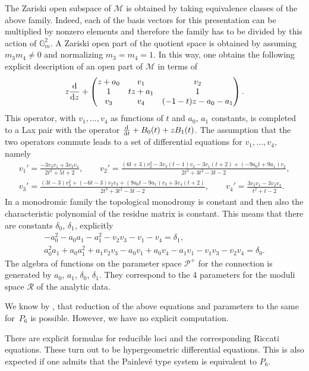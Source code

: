 \documentclass[10pt,a4paper]{amsart}
\numberwithin{equation}{section}
\begin{document}
The Zariski open subspace of $\mathcal{M}$ is obtained by taking equivalence classes of the above family.
Indeed, each of the basis vectors for this presentation can be multiplied by nonzero elements and therefore the family has to
 be divided by this action of $\mathbb{G}_m^2$. A Zariski open part of the quotient space is obtained by assuming
 $m_3m_4\neq 0$ and normalizing $m_3=m_4=1$. In this way, one obtains the following explicit description of an open part of
 $\mathcal{M}$ in terms of
\[ z\frac{{\rm d}}{{\rm d}z}+\begin{pmatrix} z+a_0&v_1 &v_2 \\ 1 & tz+a_1 &1 \\ v_3& v_4 & (-1-t)z-a_0-a_1\end{pmatrix}.\]
This operator, with $v_1,\dots ,v_4$ as functions of $t$ and $a_0$, $a_1$ constants,
 is completed to a Lax pair with the operator $\frac{{\rm d}}{{\rm d}t}+B_0(t)+zB_1(t)$. The assumption that the two operators
 commute leads to a set of differential equations for $v_1,\dots ,v_4$, namely
 \begin{gather*}
 v_1' = \frac{-3v_3v_1+3v_2v_4}{2t^2+5t+2}, \qquad
 v_2' = \frac{(6t+3)v_2^2-3v_3(t-1)v_2-3v_1(t+2)+(-9a_0t+9a_1)v_2}{2t^3+3t^2-3t-2}, \\
 v_3' = \frac{(3t-3)v_3^2+(-6t-3)v_2v_3+(9a_0t-9a_1)v_3+3v_4(t+2)}{2t^3+3t^2-3t-2},\qquad
 v_4' = \frac{3v_3 v_1-3v_2v_4}{t^2+t-2}. \end{gather*}
 In a monodromic family the topological monodromy is constant and then also the characteristic polynomial of the residue matrix
 is constant. This means that there are constants $\delta_0$, $\delta_1$, explicitly
 \begin{gather*} -a_0^2-a_0a_1-a_1^2-v_2v_3-v_1-v_4=\delta_1,\\
 a_0^2a_1+a_0a_1^2+a_1v_2v_3-a_0v_1+a_0v_4-a_1v_1-v_1v_3-v_2v_4=\delta_0. \end{gather*}
The algebra of functions on the parameter space $\mathcal{P}^+$ for the connection
is generated by $a_0$, $a_1$, $\delta_0$, $\delta_1$. They correspond to the
 4 parameters for the moduli space $\mathcal{R}$ of the analytic data.

We know by \cite{H,Maz}, that reduction of the above equations and parameters to the same for~$P_6$ is possible.
However, we have no explicit computation.

\begin{Remark} There are explicit formulas for reducible loci and the corresponding Riccati equations. These turn out to be
hypergeometric differential equations. This is also expected if one admits that the Painlev\'e type system is
equivalent to $P_6$.
\end{Remark}
\end{document}
